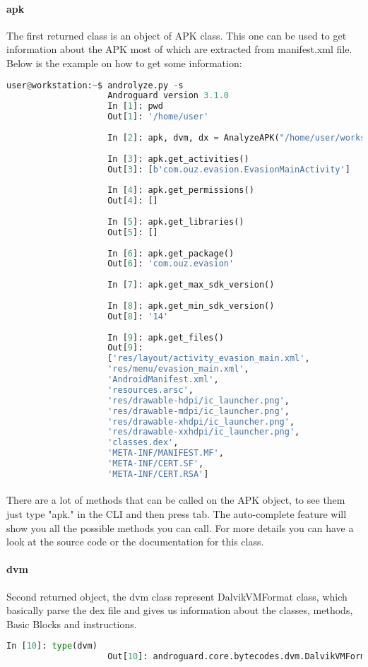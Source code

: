 \documentclass[../main.tex]{subfile}
\begin{document}
			\paragraph{apk}  The first returned class is an object of APK class. This one can be used to get information about the APK most of which are extracted from manifest.xml file. Below is the example on how to get some information:
		
				\begin{lstlisting}[language=python]
					user@workstation:~$ androlyze.py -s
					Androguard version 3.1.0
					In [1]: pwd
					Out[1]: '/home/user'
					
					In [2]: apk, dvm, dx = AnalyzeAPK("/home/user/workspace/apps/evasion.apk")
					
					In [3]: apk.get_activities()
					Out[3]: [b'com.ouz.evasion.EvasionMainActivity']
					
					In [4]: apk.get_permissions()
					Out[4]: []
					
					In [5]: apk.get_libraries()
					Out[5]: []
					
					In [6]: apk.get_package()
					Out[6]: 'com.ouz.evasion'
					
					In [7]: apk.get_max_sdk_version()
					
					In [8]: apk.get_min_sdk_version()
					Out[8]: '14'
					
					In [9]: apk.get_files()
					Out[9]: 
					['res/layout/activity_evasion_main.xml',
					'res/menu/evasion_main.xml',
					'AndroidManifest.xml',
					'resources.arsc',
					'res/drawable-hdpi/ic_launcher.png',
					'res/drawable-mdpi/ic_launcher.png',
					'res/drawable-xhdpi/ic_launcher.png',
					'res/drawable-xxhdpi/ic_launcher.png',
					'classes.dex',
					'META-INF/MANIFEST.MF',
					'META-INF/CERT.SF',
					'META-INF/CERT.RSA']
				\end{lstlisting}
			\paragraph{} There are a lot of methods that can be called on the APK object, to see them just type "apk." in the CLI and then press tab. The auto-complete feature will show you all the possible methods you can call. For more details you can have a look at the source code or the documentation for this class.
			
			\paragraph{dvm} Second returned object, the dvm class represent DalvikVMFormat class, which basically parse the dex file and gives us information about the classes, methods, Basic Blocks and instructions.
				\begin{lstlisting}[language=python, firstnumber=39]
					In [10]: type(dvm)
					Out[10]: androguard.core.bytecodes.dvm.DalvikVMFormat
				\end{lstlisting}
\end{document}
